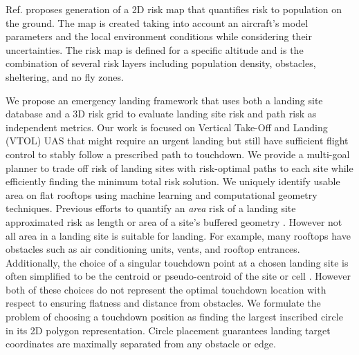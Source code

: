 Ref. \cite{primatesta_ground_2020} proposes generation of a 2D risk map that quantifies  risk to population on the ground. The map is created taking into account an aircraft's model parameters and the local environment conditions while considering their uncertainties. The risk map is defined for a specific altitude and is the combination of several risk layers including population density, obstacles, sheltering, and no fly zones.

We propose an emergency landing framework that uses both a landing site database and a 3D risk grid to evaluate landing site risk and path risk as independent metrics. Our work is focused on Vertical Take-Off and Landing (VTOL) UAS that might require an urgent landing but still have sufficient flight control to stably follow a prescribed path to touchdown. We provide a  multi-goal planner to trade off risk of landing sites with risk-optimal paths to each site while efficiently finding the minimum total risk solution. We uniquely identify usable area on flat rooftops using machine learning and computational geometry techniques. Previous efforts to quantify an \emph{area} risk of a landing site approximated risk as length or area of a site's buffered geometry \cite{di_donato_evaluating_2017}. However not all area in a landing site is suitable for landing. For example, many rooftops have obstacles such as air conditioning units, vents, and rooftop entrances. Additionally, the choice of a singular touchdown point at a chosen landing site is often simplified to be the centroid or pseudo-centroid of the site or cell \cite{di_donato_evaluating_2017, mejias_alvarez_forced_2009}. However both of these choices do not represent the optimal touchdown location with respect to ensuring flatness and distance from obstacles. We formulate the problem of choosing a touchdown position as finding the largest inscribed circle in its 2D polygon representation. Circle placement guarantees landing target coordinates are maximally separated from any obstacle or edge. 




